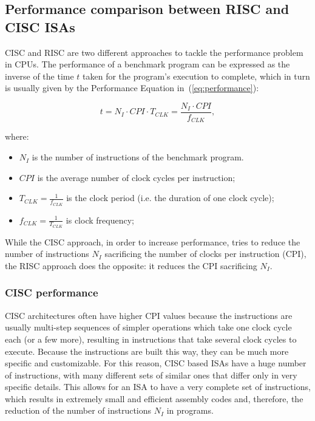 \subsection{Performance comparison between RISC and CISC ISAs}
\label{subsections:riscciscperformance}

CISC and RISC are two different approaches to tackle the performance problem in
CPUs. The performance of a benchmark program can be expressed as the inverse of
the time $t$ taken for the program's execution to complete, which in turn is
usually given by the Performance Equation in~(\ref{eq:performance}):

\begin{equation}
\label{eq:performance}
t = N_I \cdot CPI \cdot T_{CLK} = \frac{N_I \cdot CPI}{f_{CLK}},
\end{equation}

where:

\begin{itemize}
	\item $N_I$ is the number of instructions of the benchmark program.
	\item $CPI$ is the average number of clock cycles per instruction;
	\item $T_{CLK} = \frac{1}{f_{CLK}}$ is the clock period (i.e. the duration of one clock cycle);
	\item $f_{CLK}   = \frac{1}{T_{CLK}}$ is clock frequency;
\end{itemize}

While the CISC approach, in order to increase performance, tries to reduce the
number of instructions $N_I$ sacrificing the number of clocks per instruction
(CPI), the RISC approach does the opposite: it reduces the CPI sacrificing
$N_I$.

\subsubsection{CISC performance}
CISC architectures often have higher CPI values because the instructions are
usually multi-step sequences of simpler operations which take one clock cycle
each (or a few more), resulting in instructions that take several clock cycles
to execute. Because the instructions are built this way, they can be much more
specific and customizable. For this reason, CISC based ISAs have a huge number
of instructions, with many different sets of similar ones that differ only in
very specific details. This allows for an ISA to have a very complete set of
instructions, which results in extremely small and efficient assembly codes and,
therefore, the reduction of the number of instructions $N_I$ in programs.

